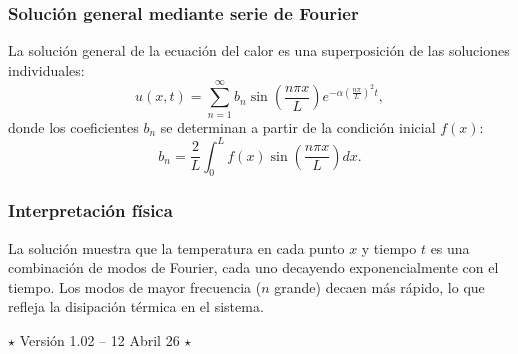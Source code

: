 \documentclass[12pt, a4paper]{article}
\theoremstyle{rioplatense}
\begin{document}
\subsubsection{Solución general mediante serie de Fourier}
La solución general de la ecuación del calor es una superposición de las soluciones individuales:
\[
u(x,t) = \sum_{n=1}^{\infty} b_n \sin\left(\frac{n\pi x}{L}\right) e^{-\alpha \left(\frac{n\pi}{L}\right)^2 t},
\]
donde los coeficientes $b_n$ se determinan a partir de la condición inicial $f(x)$:
\[
b_n = \frac{2}{L} \int_0^L f(x) \sin\left(\frac{n\pi x}{L}\right) dx.
\]

\subsubsection{Interpretación física}
La solución muestra que la temperatura en cada punto $x$ y tiempo $t$ es una combinación de modos de Fourier, cada uno decayendo exponencialmente con el tiempo. Los modos de mayor frecuencia ($n$ grande) decaen más rápido, lo que refleja la disipación térmica en el sistema.

\begin{center}
$\star$
Versión 1.02 -- 12 Abril 26
$\star$
\end{center}
\end{document}
